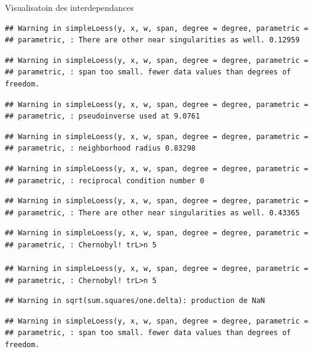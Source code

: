 \documentclass[11pt,ignorenonframetext,]{beamer}
\begin{document}
\begin{frame}[fragile]{Visualisatoin des interdependances}
\begin{verbatim}
## Warning in simpleLoess(y, x, w, span, degree = degree, parametric =
## parametric, : There are other near singularities as well. 0.12959
\end{verbatim}

\begin{verbatim}
## Warning in simpleLoess(y, x, w, span, degree = degree, parametric =
## parametric, : span too small. fewer data values than degrees of freedom.
\end{verbatim}

\begin{verbatim}
## Warning in simpleLoess(y, x, w, span, degree = degree, parametric =
## parametric, : pseudoinverse used at 9.0761
\end{verbatim}

\begin{verbatim}
## Warning in simpleLoess(y, x, w, span, degree = degree, parametric =
## parametric, : neighborhood radius 0.83298
\end{verbatim}

\begin{verbatim}
## Warning in simpleLoess(y, x, w, span, degree = degree, parametric =
## parametric, : reciprocal condition number 0
\end{verbatim}

\begin{verbatim}
## Warning in simpleLoess(y, x, w, span, degree = degree, parametric =
## parametric, : There are other near singularities as well. 0.43365
\end{verbatim}

\begin{verbatim}
## Warning in simpleLoess(y, x, w, span, degree = degree, parametric =
## parametric, : Chernobyl! trL>n 5

## Warning in simpleLoess(y, x, w, span, degree = degree, parametric =
## parametric, : Chernobyl! trL>n 5
\end{verbatim}

\begin{verbatim}
## Warning in sqrt(sum.squares/one.delta): production de NaN
\end{verbatim}

\begin{verbatim}
## Warning in simpleLoess(y, x, w, span, degree = degree, parametric =
## parametric, : span too small. fewer data values than degrees of freedom.
\end{verbatim}


\end{frame}
\end{document}
